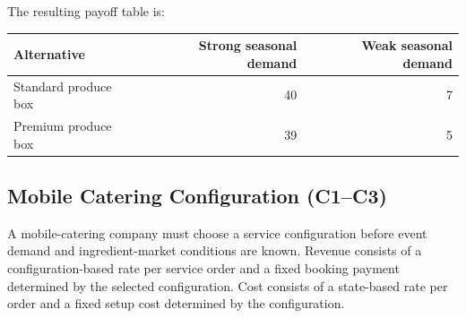 The resulting payoff table is:

\begin{center}
	\begin{tabular}{lrr}
		\toprule
		Alternative & Strong seasonal demand & Weak seasonal demand \\
		\midrule
		Standard produce box & 40 & 7 \\
		Premium produce box & 39 & 5 \\
		\bottomrule
	\end{tabular}
\end{center}


\subsection{Mobile Catering Configuration (C1--C3)}
\label{sec:problem10-mobile-catering-configuration-c1-c3}

A mobile-catering company must choose a service configuration before event
demand and ingredient-market conditions are known. Revenue consists of a
configuration-based rate per service order and a fixed booking payment
determined by the selected configuration. Cost consists of a state-based
rate per order and a fixed setup cost determined by the configuration.

